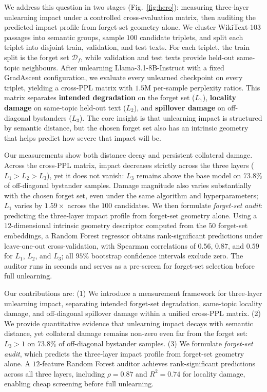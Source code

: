 \documentclass[11pt]{article}
\newcommand{\Df}{\mathcal{D}_f}
\newcommand{\Lone}{L_1}
\newcommand{\Ltwo}{L_2}
\newcommand{\Lthree}{L_3}
\begin{document}
We address this question in two stages (Fig.~\ref{fig:hero}): measuring three-layer unlearning impact under a controlled cross-evaluation matrix, then auditing the predicted impact profile from forget-set geometry alone. We cluster WikiText-103 passages into semantic
groups, sample $100$ candidate triplets, and split each triplet into disjoint
train, validation, and test texts. For each triplet, the train split is the
forget set $\Df$, while validation and test texts provide held-out same-topic
neighbours. After unlearning Llama-3.1-8B-Instruct with a fixed GradAscent
configuration, we evaluate every unlearned checkpoint on every triplet,
yielding a cross-PPL matrix with $1.5$M per-sample perplexity ratios. This
matrix separates \textbf{intended degradation} on the forget set ($\Lone$),
\textbf{locality damage} on same-topic held-out text ($\Ltwo$), and
\textbf{spillover damage} on off-diagonal bystanders ($\Lthree$). The core
insight is that unlearning impact is structured by semantic distance, but the
chosen forget set also has an intrinsic geometry that helps predict how severe
that impact will be.

Our measurements show both distance decay and persistent collateral damage.
Across the cross-PPL matrix, impact decreases strictly across the three layers
($\Lone{>}\Ltwo{>}\Lthree$), yet it does not vanish: $\Lthree$ remains above the
base model on $73.8\%$ of off-diagonal bystander samples. Damage magnitude also varies substantially with the chosen forget
set, even under the same algorithm and hyperparameters; $\Lone$ varies by
$1.59\times$ across the $100$ candidates. We then formulate \emph{forget-set
audit}: predicting the three-layer impact profile from forget-set geometry
alone. Using a $12$-dimensional intrinsic geometry descriptor computed from the
$50$ forget-set embeddings, a Random Forest regressor obtains rank-significant
predictions under leave-one-out cross-validation, with Spearman correlations of
$0.56$, $0.87$, and $0.59$ for $\Lone$, $\Ltwo$, and $\Lthree$; all $95\%$
bootstrap confidence intervals exclude zero. The auditor runs in seconds and
serves as a pre-screen for forget-set selection before full unlearning.

Our contributions are:
(1) We introduce a measurement framework for three-layer unlearning impact,
separating intended forget-set degradation, same-topic locality damage, and
off-diagonal spillover damage within a unified cross-PPL matrix.
(2) We provide quantitative evidence that unlearning impact decays with
semantic distance, yet collateral damage remains non-zero even far from the
forget set: $\Lthree > 1$ on $73.8\%$ of off-diagonal bystander samples.
(3) We formulate \emph{forget-set audit}, which predicts the three-layer impact
profile from forget-set geometry alone. A $12$-feature Random Forest auditor
achieves rank-significant predictions across all three layers, including
$\rho = 0.87$ and $R^2 = 0.74$ for locality damage, enabling cheap screening
before full unlearning.
\end{document}

